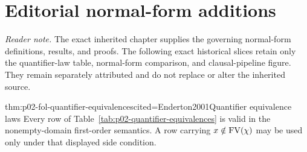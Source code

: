 \section*{Editorial normal-form additions}
\noindent\textit{Reader note.} The exact inherited chapter supplies the governing
normal-form definitions, results, and proofs.  The following exact historical
slices retain only the quantifier-law table, normal-form comparison, and
clausal-pipeline figure.
They remain separately attributed and do not replace or alter the inherited
source.

\begin{hbtheorem}{thm:p02-fol-quantifier-equivalences}{cited=Enderton2001}{Quantifier equivalence laws}
Every row of Table~\ref{tab:p02-quantifier-equivalences} is valid in the
nonempty-domain first-order semantics.  A row carrying
\(x\notin\operatorname{FV}(\chi)\) may be used only under that displayed side condition.
\end{hbtheorem}

